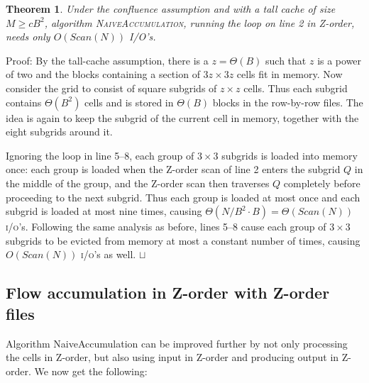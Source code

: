 \documentclass[10pt,a4paper]{article}
\newtheorem{theorem}{Theorem}
\newenvironment{proof}{Proof:}{\qed}
\def\squareforqed{\hbox{\rlap{$\sqcap$}$\sqcup$}}
\def\qed{\ifmmode\squareforqed\else{\unskip\nobreak\hfil
\penalty50\hskip1em\null\nobreak\hfil\squareforqed
\parfillskip=0pt\finalhyphendemerits=0\endgraf}\fi}
\def\ios{\textsc{i/o}'s\xspace}
\def\scan{\mathit{Scan}}
\begin{document}
\begin{theorem}\label{NaiveAccumulationZonRrealistic}
Under the confluence assumption and with a tall cache of size $M \geq c B^2$, algorithm \textsc{NaiveAccumulation}, running the loop on line 2 in Z-order, needs only $O(\scan(N))$ I/O's.
\end{theorem}
\begin{proof}
By the tall-cache assumption, there is a $z = \Theta(B)$ such that $z$ is a power of two and the blocks containing a section of $3z \times 3z$ cells fit in memory. Now consider the grid to consist of square subgrids of $z \times z$ cells. Thus each subgrid contains $\Theta(B^2)$ cells and is stored in $\Theta(B)$ blocks in the row-by-row files. The idea is again to keep the subgrid of the current cell in memory, together with the eight subgrids around it.

Ignoring the loop in line 5--8, each group of $3 \times 3$ subgrids is loaded into memory once: each group is loaded when the Z-order scan of line 2 enters the subgrid $Q$ in the middle of the group, and the Z-order scan then traverses $Q$ completely before proceeding to the next subgrid. Thus each group is loaded at most once and each subgrid is loaded at most nine times, causing $\Theta(N/B^2 \cdot B) = \Theta(\scan(N))$ \ios. Following the same analysis as before, lines 5--8 cause each group of $3 \times 3$ subgrids to be evicted from memory at most a constant number of times, causing $O(\scan(N))$ \ios as well.
\end{proof}

\subsection{Flow accumulation in Z-order with Z-order files}

Algorithm NaiveAccumulation can be improved further by not only processing the cells in Z-order, but also using input in Z-order and producing output in Z-order. We now get the following:
\end{document}
